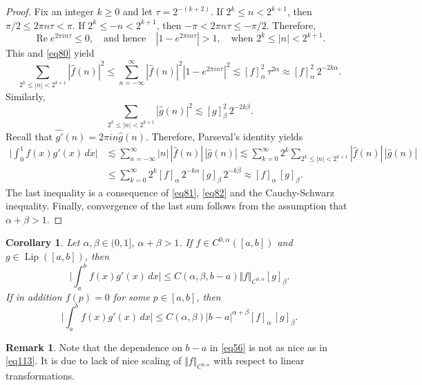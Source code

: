 \documentclass[intlimits,12pt,reqno]{amsart}
\numberwithin{equation}{section}
\def\lip{\operatorname{Lip}}
\newtheorem{corollary}[theorem]{Corollary}
\theoremstyle{definition}
\newtheorem{remark}[theorem]{Remark}
\begin{document}
\begin{proof}
Fix an integer $k\geq 0$ and let $\tau=2^{-(k+2)}$. If $2^k\leq n<2^{k+1}$, then
$\pi/2\leq 2\pi n\tau<\pi$. 
If $2^k\leq -n<2^{k+1}$, then $-\pi<2\pi n\tau\leq-\pi/2$. Therefore,
$$
\operatorname{Re} e^{2\pi in\tau}\leq 0,
\quad
\text{and hence}
\quad
|1-e^{2\pi in\tau}|>1,
\quad
\text{when $2^k\leq |n|<2^{k+1}$}.
$$
This and \eqref{eq80} yield
\begin{equation}
\label{eq81}
\sum_{2^k\leq |n|<2^{k+1}}|\hat{f}(n)|^2\leq
\sum_{n=-\infty}^\infty |\hat{f}(n)|^2|1-e^{2\pi in\tau}|^2\lesssim
[f]^2_{\alpha}\,\tau^{2\alpha}\approx
[f]^2_{\alpha}\,2^{-2k\alpha}.
\end{equation}
Similarly,
\begin{equation}
\label{eq82}
\sum_{2^k\leq |n|<2^{k+1}}|\hat{g}(n)|^2\lesssim
[g]^2_{\beta}\,2^{-2k\beta}.
\end{equation}
Recall that $\hat{g'}(n)=2\pi in\hat{g}(n)$. Therefore, Parseval's identity yields
\[
\begin{split}
\Bigg|\int_0^1 f(x)g'(x)\, dx\Bigg|
&\lesssim
\sum_{n=-\infty}^\infty |n|\, |\hat{f}(n)|\, |\hat{g}(n)|
\lesssim
\sum_{k=0}^\infty 2^k \sum_{2^k\leq |n|<2^{k+1}} |\hat{f}(n)|\, |\hat{g}(n)|\\
&\leq
\sum_{k=0}^\infty 2^k [f]_{\alpha}\, 2^{-k\alpha}[g]_{\beta}\, 2^{-k\beta}
\approx 
[f]_{\alpha}\,[g]_{\beta}.
\end{split}
\]
The last inequality is a consequence of \eqref{eq81}, \eqref{eq82} and the Cauchy-Schwarz inequality. Finally, convergence of the last sum follows from the assumption that $\alpha+\beta>1$.
\end{proof}
\begin{corollary}
\label{T75}
Let $\alpha,\beta\in (0,1]$, $\alpha+\beta>1$. If $f\in C^{0,\alpha}([a,b])$ and $g\in\lip([a,b])$, then
\begin{equation}
\label{eq56}
\Bigg|\int_a^b f(x)g'(x)\, dx\Bigg|\leq C(\alpha,\beta,b-a) \Vert f\Vert_{C^{0,\alpha}}[g]_{\beta}.
\end{equation}
If in addition $f(p)=0$ for some $p\in [a,b]$, then
\begin{equation}
\label{eq113}
\Bigg|\int_a^b f(x)g'(x)\, dx\Bigg|\leq C(\alpha,\beta)|b-a|^{\alpha+\beta} [f]_{\alpha}\,[g]_{\beta}.
\end{equation}
\end{corollary}
\begin{remark}
Note that the dependence on $b-a$ in \eqref{eq56} is not as nice as in \eqref{eq113}. It is due to lack of nice scaling of $\Vert f\Vert_{C^{0,\alpha}}$ with respect to linear transformations.
\end{remark}
\end{document}
